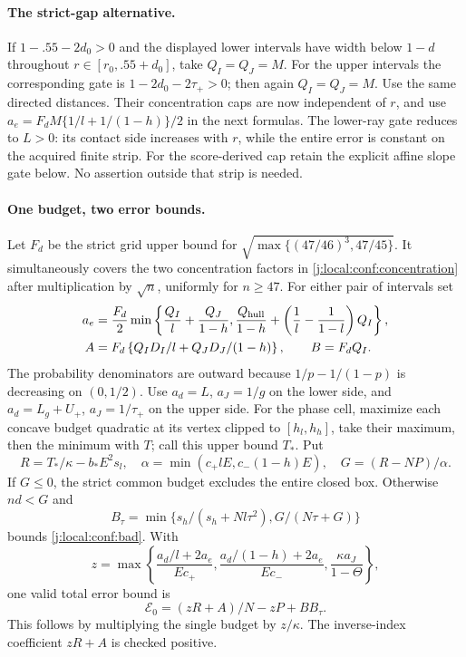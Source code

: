 \paragraph{The strict-gap alternative.}
If $1-.55-2d_0>0$ and the displayed lower intervals have width below
$1-d$ throughout $r\in[r_0,.55+d_0]$, take $Q_I=Q_J=M$.
For the upper intervals the corresponding gate is
$1-2d_0-2\tau_+>0$; then again $Q_I=Q_J=M$.
Use the same directed distances. Their concentration caps are now
independent of $r$, and use
$a_e=F_dM\{1/l+1/(1-h)\}/2$ in the next formulas.
The lower-ray gate reduces to $L>0$: its contact side increases with
$r$, while the entire error is constant on the acquired finite strip.
For the score-derived cap retain the explicit affine slope gate below.
No assertion outside that strip is needed.

\paragraph{One budget, two error bounds.}
Let $F_d$ be the strict grid upper bound for
$\sqrt{\max\{(47/46)^3,47/45\}}$. It simultaneously covers the two
concentration factors in \eqref{j:local:conf:concentration} after multiplication by
$\sqrt n$, uniformly for $n\ge47$. For either pair of intervals set
\begin{align*}
 a_e&=\frac{F_d}{2}\min\left\{\frac{Q_I}l+\frac{Q_J}{1-h},
 \frac{Q_{\rm hull}}{1-h}+\left(\frac1l-\frac1{1-l}\right)Q_I\right\},\\
 A&=F_d\left\{Q_ID_I/l+Q_JD_J/(1-h)\right\},\qquad B=F_dQ_I.
\end{align*}
The probability denominators are outward because $1/p-1/(1-p)$ is
decreasing on $(0,1/2)$.
Use $a_d=L$, $a_J=1/g$ on the lower side, and
$a_d=L_g+U_+$, $a_J=1/\tau_+$ on the upper side.
For the phase cell, maximize each concave budget quadratic at its
vertex clipped to $[h_l,h_h]$, take their maximum, then the minimum
with $T$; call this upper bound $T_*$. Put
\[
 R=T_*/\kappa-b_*E^2s_l,
 \quad\alpha=\min(c_+lE,c_-(1-h)E),\quad G=(R-NP)/\alpha.
\]
If $G\le0$, the strict common budget excludes the entire closed box.
Otherwise $nd<G$ and
\[
 B_\tau=\min\{s_h/(s_h+Nl\tau^2),G/(N\tau+G)\}
\]
bounds \eqref{j:local:conf:bad}. With
\[
 z=\max\left\{\frac{a_d/l+2a_e}{Ec_+},
 \frac{a_d/(1-h)+2a_e}{Ec_-},\frac{\kappa a_J}{1-\Theta}\right\},
\]
one valid total error bound is
\begin{equation}\label{j:local:conf:oldbound}
 \mathcal E_0=(zR+A)/N-zP+B B_\tau.
\end{equation}
This follows by multiplying the single budget by $z/\kappa$.
The inverse-index coefficient $zR+A$ is checked positive.

